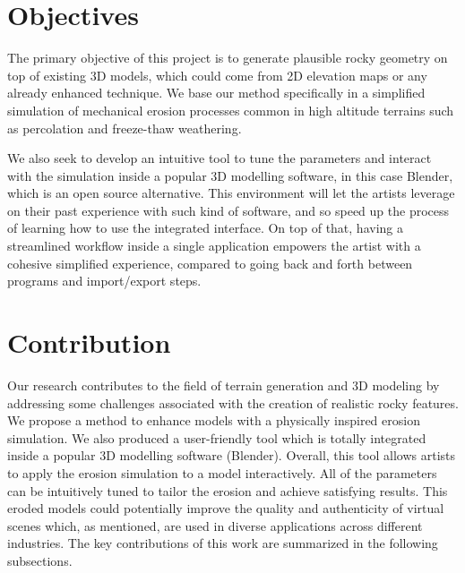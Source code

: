 \section{Objectives}

The primary objective of this project is to generate plausible rocky geometry on top of existing 3D models, which could come from 2D elevation maps or any already enhanced technique. We base our method specifically in a simplified simulation of mechanical erosion processes common in high altitude terrains such as percolation and freeze-thaw weathering.

\vspace{0.5\baselineskip}
We also seek to develop an intuitive tool to tune the parameters and interact with the simulation inside a popular 3D modelling software, in this case Blender, which is an open source alternative. This environment will let the artists leverage on their past experience with such kind of software, and so speed up the process of learning how to use the integrated interface. On top of that, having a streamlined workflow inside a single application empowers the artist with a cohesive simplified experience, compared to going back and forth between programs and import/export steps.

\section{Contribution}

Our research contributes to the field of terrain generation and 3D modeling by addressing some challenges associated with the creation of realistic rocky features. We propose a method to enhance models with a physically inspired erosion simulation. We also produced a user-friendly tool which is totally integrated inside a popular 3D modelling software (Blender). Overall, this tool allows artists to apply the erosion simulation to a model interactively. All of the parameters can be intuitively tuned to tailor the erosion and achieve satisfying results. This eroded models could potentially improve the quality and authenticity of virtual scenes which, as mentioned, are used in diverse applications across different industries. The key contributions of this work are summarized in the following subsections.

